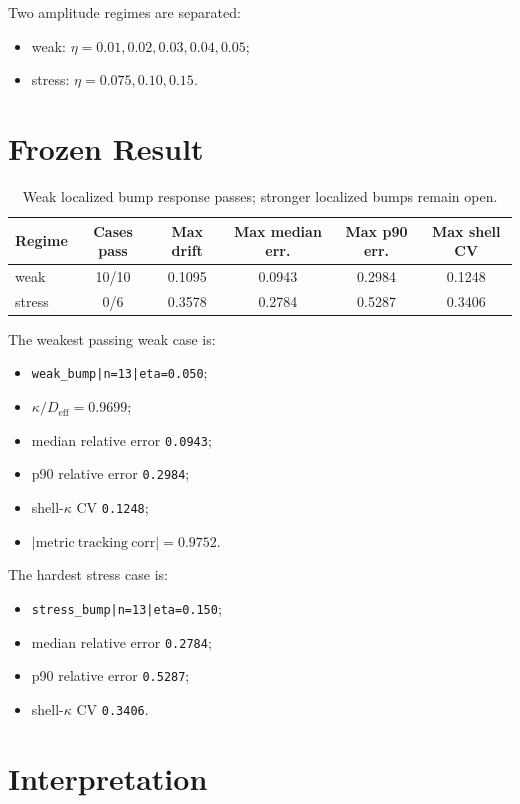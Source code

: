 \documentclass[11pt]{article}
\begin{document}
Two amplitude regimes are separated:
\begin{itemize}
\item weak: \(\eta = 0.01, 0.02, 0.03, 0.04, 0.05\);
\item stress: \(\eta = 0.075, 0.10, 0.15\).
\end{itemize}

\section{Frozen Result}

\begin{table}[h!]
\centering
\begin{tabular}{@{}lccccc@{}}
\toprule
Regime & Cases pass & Max drift & Max median err. & Max p90 err. & Max shell CV \\
\midrule
weak & 10/10 & 0.1095 & 0.0943 & 0.2984 & 0.1248 \\
stress & 0/6 & 0.3578 & 0.2784 & 0.5287 & 0.3406 \\
\bottomrule
\end{tabular}
\caption{Weak localized bump response passes; stronger localized bumps remain open.}
\end{table}

The weakest passing weak case is:
\begin{itemize}
\item \texttt{weak\_bump|n=13|eta=0.050};
\item \(\kappa/D_{\mathrm{eff}} = 0.9699\);
\item median relative error \texttt{0.0943};
\item p90 relative error \texttt{0.2984};
\item shell-\(\kappa\) CV \texttt{0.1248};
\item \(|\mathrm{metric\ tracking\ corr}| = 0.9752\).
\end{itemize}

The hardest stress case is:
\begin{itemize}
\item \texttt{stress\_bump|n=13|eta=0.150};
\item median relative error \texttt{0.2784};
\item p90 relative error \texttt{0.5287};
\item shell-\(\kappa\) CV \texttt{0.3406}.
\end{itemize}

\section{Interpretation}
\end{document}
